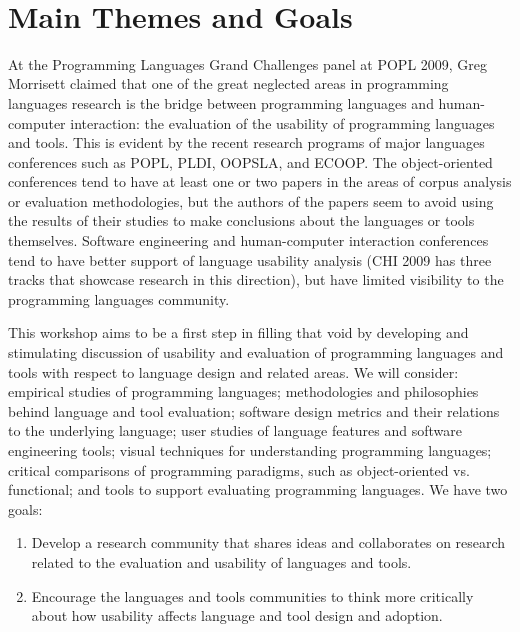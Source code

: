 \documentclass{sigplanconf}
\begin{document}
\\




\section{Main Themes and Goals}

At the Programming Languages Grand Challenges panel at POPL 2009, Greg
Morrisett claimed that one of the great neglected areas in programming
languages research is the bridge between programming languages and
human-computer interaction: the evaluation of the usability of
programming languages and tools. This is evident by the recent
research programs of major languages conferences such as POPL, PLDI,
OOPSLA, and ECOOP. The object-oriented conferences tend to have at
least one or two papers in the areas of corpus analysis or evaluation
methodologies, but the authors of the papers seem to avoid using the
results of their studies to make conclusions about the languages or
tools themselves. Software engineering and human-computer interaction
conferences tend to have better support of language usability analysis
(CHI 2009 has three tracks that showcase research in this direction),
but have limited visibility to the programming languages community.

This workshop aims to be a first step in filling that void by
developing and stimulating discussion of usability and evaluation of
programming languages and tools with respect to language design and
related areas. We will consider: empirical studies of programming
languages; methodologies and philosophies behind language and tool
evaluation; software design metrics and their relations to the
underlying language; user studies of language features and software
engineering tools; visual techniques for understanding programming
languages; critical comparisons of programming paradigms, such as
object-oriented vs. functional; and tools to support evaluating
programming languages. We have two goals:

\begin{enumerate}
  \item 
Develop a research community that shares ideas and collaborates on 
research related to the evaluation and usability of languages and tools.
\item
Encourage the languages and tools communities to think more critically
about how usability affects language and tool design and
adoption.
\end{enumerate}
\end{document}
